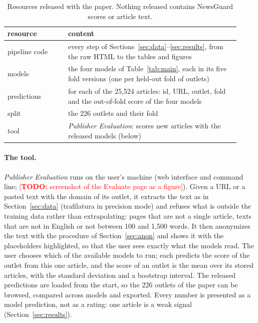 \documentclass[11pt,a4paper]{article}
\newcommand{\todo}[1]{\textcolor{red}{[\textbf{TODO:} #1]}}
\begin{document}
\begin{table}[t]
\centering\small
\caption{Resources released with the paper. Nothing released contains NewsGuard scores or article text.}\label{tab:release}
\begin{tabular}{p{0.24\linewidth}p{0.68\linewidth}}
\toprule
resource & content \\
\midrule
pipeline code & every step of Sections~\ref{sec:data}--\ref{sec:results}, from the raw HTML to the tables and figures \\
models & the four models of Table~\ref{tab:main}, each in its five fold versions (one per held-out fold of outlets) \\
predictions & for each of the 25,524 articles: id, URL, outlet, fold and the out-of-fold score of the four models \\
split & the 226 outlets and their fold \\
tool & \emph{Publisher Evaluation}: scores new articles with the released models (below) \\
\bottomrule
\end{tabular}
\end{table}

\paragraph{The tool.} \emph{Publisher Evaluation} runs on the user's machine (web interface and command line;
\todo{screenshot of the Evaluate page as a figure}). Given a URL or a pasted text with the domain of its outlet, it
extracts the text as in Section~\ref{sec:data} (trafilatura in precision mode) and refuses what is outside the
training data rather than extrapolating: pages that are not a single article, texts that are not in English or not
between 100 and 1,500 words. It then anonymizes the text with the procedure of Section~\ref{sec:anon} and shows it
with the placeholders highlighted, so that the user sees exactly what the models read. The user chooses which of the
available models to run; each predicts the score of the outlet from this one article, and the score of an outlet is
the mean over its stored articles, with the standard deviation and a bootstrap interval. The released predictions are
loaded from the start, so the 226 outlets of the paper can be browsed, compared across models and exported. Every
number is presented as a model prediction, not as a rating: one article is a weak signal
(Section~\ref{sec:results}).
\end{document}
